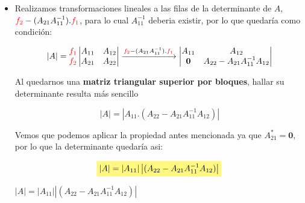 \documentclass[12pt]{article}
\newcommand{\highlight}[2][yellow]{\mathchoice%
  {\colorbox{#1}{$\displaystyle#2$}}%
  {\colorbox{#1}{$\textstyle#2$}}%
  {\colorbox{#1}{$\scriptstyle#2$}}%
  {\colorbox{#1}{$\scriptscriptstyle#2$}}}%
\begin{document}
\begin{itemize}
    \item Realizamos transformaciones lineales a las filas de la determinante de $A$,  $\color{red} f_2 \color{black} - (A_{21} A_{11}^{-1}). \color{red} f_1 \color{black}$, para lo cual $ A_{11}^{-1}$ deberia existir, por lo que quedaría como condición:

    \begin{equation*}
        \left | A \right | = \begin{matrix} \color{red} f_1 \\ \color{red} f_2 \end{matrix} \begin{vmatrix}     A_{11} & A_{12}\\ A_{21} & A_{22} \end{vmatrix} \xrightarrow{ \color{red} f_2 \color{black} - (A_{21} A_{11}^{-1}). \color{red} f_1 \color{black}} \begin{vmatrix} A_{11} & A_{12}\\ \textbf{0} & A_{22} - A_{21} A_{11}^{-1} A_{12} \end{vmatrix}
    \end{equation*}

    Al quedarnos una \textbf{matriz triangular superior por bloques}, hallar su determinante resulta más sencillo

    \begin{equation*}
        \left | A \right | = \left | A_{11} .(A_{22} - A_{21} A_{11}^{-1} A_{12}) \right | 
    \end{equation*}
    
    Vemos que podemos aplicar la propiedad antes mencionada ya que $A_{21}^{*} = \textbf{0}$, por lo que la determinante quedaría asi:

    \begin{equation*}
        \highlight[yellow!50!white]{\left | A \right | = \left | A_{11} \right | \left | (A_{22} - A_{21} A_{11}^{-1} A_{12}) \right |}
    \end{equation*}
    
    \begin{center}
    \begin{tcolorbox}[colback=blue!10!white ,colframe=white,width=10 cm]
        \center \large $\left | A \right | = \left | A_{11} \right | \left | (A_{22} - A_{21} A_{11}^{-1} A_{12}) \right |$
    \end{tcolorbox}
    \end{center}


\end{itemize}
\end{document}

